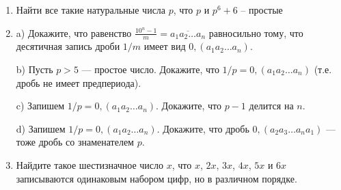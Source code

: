 \documentclass{article}
\begin{document}
\begin{enumerate}[label*=\protect\fbox{\arabic{enumi}}]
\item Найти все такие натуральные числа $p$, что $p$ и $p^6 + 6$ – простые

\item 
a) Докажите, что равенство $\frac{10^n-1}{m}=\overline{a_1a_2\dots a_n}$ равносильно тому, что десятичная запись дроби $1/m$ имеет вид $0,(a_1a_2\dots a_n)$.

b) Пусть $p>5$ --- простое число.  Докажите, что $1/p=0,(a_1a_2\dots a_n)$ (т.е. дробь не имеет предпериода).

c) Запишем $1/p=0,(a_1a_2\dots a_n)$. Докажите, что $p-1$ делится на $n$.

d) Запишем $1/p=0,(a_1a_2\dots a_n)$. Докажите, что дробь $0,(a_2a_3\dots a_na_1)$ --- тоже дробь со знаменателем $p$.

\item Найдите такое шестизначное число $x$, что $x$, $2x$, $3x$, $4x$, $5x$ и $6x$ записываются одинаковым набором цифр, но в различном порядке.

\end{enumerate}
\end{document}
